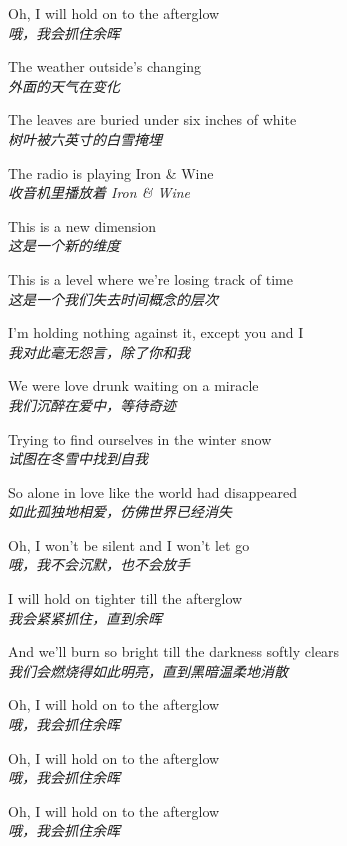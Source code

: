 \begin{spacing}{1.5}
\begin{flushleft}
Oh, I will hold on to the afterglow\\
\textit{哦，我会抓住余晖}\lyricspace

The weather outside's changing\\
\textit{外面的天气在变化}\lyricspace

The leaves are buried under six inches of white\\
\textit{树叶被六英寸的白雪掩埋}\lyricspace

The radio is playing Iron & Wine\\
\textit{收音机里播放着 Iron & Wine}\lyricspace

This is a new dimension\\
\textit{这是一个新的维度}\lyricspace

This is a level where we're losing track of time\\
\textit{这是一个我们失去时间概念的层次}\lyricspace

I'm holding nothing against it, except you and I\\
\textit{我对此毫无怨言，除了你和我}\lyricspace

We were love drunk waiting on a miracle\\
\textit{我们沉醉在爱中，等待奇迹}\lyricspace

Trying to find ourselves in the winter snow\\
\textit{试图在冬雪中找到自我}\lyricspace

So alone in love like the world had disappeared\\
\textit{如此孤独地相爱，仿佛世界已经消失}\lyricspace

Oh, I won't be silent and I won't let go\\
\textit{哦，我不会沉默，也不会放手}\lyricspace

I will hold on tighter till the afterglow\\
\textit{我会紧紧抓住，直到余晖}\lyricspace

And we'll burn so bright till the darkness softly clears\\
\textit{我们会燃烧得如此明亮，直到黑暗温柔地消散}\lyricspace

Oh, I will hold on to the afterglow\\
\textit{哦，我会抓住余晖}\lyricspace

Oh, I will hold on to the afterglow\\
\textit{哦，我会抓住余晖}\lyricspace

Oh, I will hold on to the afterglow\\
\textit{哦，我会抓住余晖}\lyricspace
\end{flushleft}
\end{spacing} 
